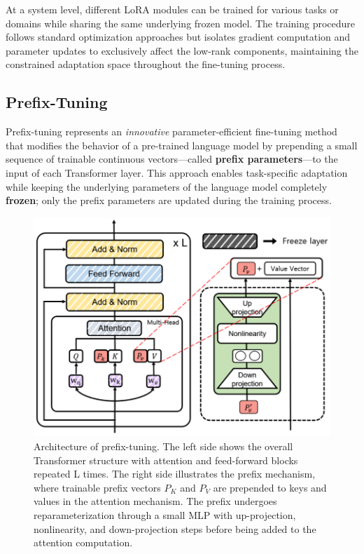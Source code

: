 At a system level, different LoRA modules can be trained for various tasks or domains while sharing the same underlying frozen model. The training procedure follows standard optimization approaches but isolates gradient computation and parameter updates to exclusively affect the low-rank components, maintaining the constrained adaptation space throughout the fine-tuning process.

\subsection{Prefix-Tuning}
Prefix-tuning represents an \textit{innovative} parameter-efficient fine-tuning method that modifies the behavior of a pre-trained language model by prepending a small sequence of trainable continuous vectors—called \textbf{prefix parameters}—to the input of each Transformer layer. This approach enables task-specific adaptation while keeping the underlying parameters of the language model completely \textbf{frozen}; only the prefix parameters are updated during the training process.

\begin{figure}[t]
\centering
\includegraphics[width=\linewidth]{img/chap05/5.2.4.png}
\caption{Architecture of prefix-tuning. The left side shows the overall Transformer structure with attention and feed-forward blocks repeated L times. The right side illustrates the prefix mechanism, where trainable prefix vectors $P_K$ and $P_V$ are prepended to keys and values in the attention mechanism. The prefix undergoes reparameterization through a small MLP with up-projection, nonlinearity, and down-projection steps before being added to the attention computation.}
\label{fig:prefix_tuning}
\end{figure}

